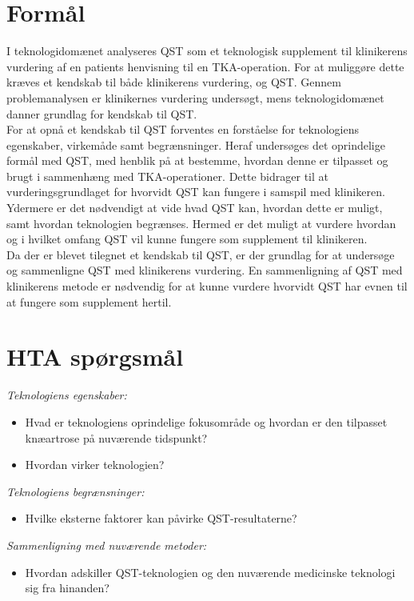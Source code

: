 \section{Formål}
I teknologidomænet analyseres QST som et teknologisk supplement til klinikerens vurdering af en patients henvisning til en TKA-operation.  For at muliggøre dette kræves et kendskab til både klinikerens vurdering, og QST. Gennem problemanalysen er klinikernes vurdering undersøgt, mens teknologidomænet danner grundlag for kendskab til QST.\\
For at opnå et kendskab til QST forventes en forståelse for teknologiens egenskaber, virkemåde samt begrænsninger. Heraf undersøges det oprindelige formål med QST, med henblik på at bestemme, hvordan denne er tilpasset og brugt i sammenhæng med TKA-operationer. Dette bidrager til at vurderingsgrundlaget for hvorvidt QST kan fungere i samspil med klinikeren. Ydermere er det nødvendigt at vide hvad QST kan, hvordan dette er muligt, samt hvordan teknologien begrænses. Hermed er det muligt at vurdere hvordan og i hvilket omfang QST vil kunne fungere som supplement til klinikeren.\\
Da der er blevet tilegnet et kendskab til QST, er der grundlag for at undersøge og sammenligne QST med klinikerens vurdering. En sammenligning af QST med klinikerens metode er nødvendig for at kunne vurdere hvorvidt QST har evnen til at fungere som supplement hertil. 
\section{HTA spørgsmål}
\textit{Teknologiens egenskaber:}
\begin{itemize}
	\item Hvad er teknologiens oprindelige fokusområde og hvordan er den tilpasset knæartrose på nuværende tidspunkt? %
	\item Hvordan virker teknologien?  %
\end{itemize}

\textit{Teknologiens begrænsninger:}
\begin{itemize}
	\item Hvilke eksterne faktorer kan påvirke QST-resultaterne?
\end{itemize}

\textit{Sammenligning med nuværende metoder:}
\begin{itemize}
	\item Hvordan adskiller QST-teknologien og den nuværende medicinske teknologi sig fra hinanden? %
\end{itemize}

